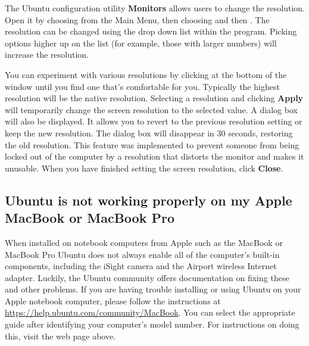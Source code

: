 The Ubuntu configuration utility \textbf{Monitors} allows users to change the resolution.
Open it by choosing  from the Main Menu, then choosing  and then .
The resolution can be changed using the drop down list within the program.
Picking options higher up on the list (for example, those with larger numbers) will increase the resolution.

You can experiment with various resolutions by clicking  at the bottom of the window until you find one that's comfortable for you. Typically the highest resolution will be the native resolution. Selecting a resolution and clicking \textbf{Apply} will temporarily change the screen resolution to the selected value.
A dialog box will also be displayed. It allows you to revert to the previous resolution setting or keep the new resolution. The dialog box will disappear in 30 seconds, restoring the old resolution.
 This feature was implemented to prevent someone from being locked out of the computer by a resolution that distorts the monitor and makes it unusable. When you have finished setting the screen resolution, click \textbf{Close}.



\subsection{Ubuntu is not working properly on my Apple MacBook or MacBook Pro}

When installed on notebook computers from Apple \dash such as the MacBook or MacBook Pro \dash Ubuntu does not always enable all of the computer's built-in components, including the iSight camera and the Airport wireless Internet adapter. Luckily, the Ubuntu community offers documentation on fixing these and other problems. If you are having trouble installing or using Ubuntu on your Apple notebook computer, please follow the instructions at \url{https://help.ubuntu.com/community/MacBook}. You can select the appropriate guide after identifying your computer's model number. For instructions on doing this, visit the web page above.

